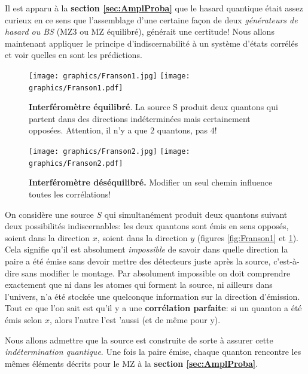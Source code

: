 Il est apparu à la \textbf{section \ref{sec:AmplProba}} que le hasard quantique
était assez curieux en ce sens que l'assemblage d'une certaine façon de deux
\emph{générateurs de hasard ou BS} (MZ3 ou MZ équilibré), générait une
certitude! Nous allons maintenant appliquer le principe d'indiscernabilité à un
système d'états corrélés et voir quelles en sont les prédictions.

\begin{figure}[ptbh]
\centering
\begin{minipage}[c]{.48\linewidth}
\centering
\ifcase\msipdfoutput
	\texttt{[image: graphics/Franson1.jpg]}%
\else
	\texttt{[image: graphics/Franson1.pdf]}%
\fi
\caption{\textbf{Interféromètre équilibré}. La source S produit deux quantons
qui partent dans des directions indéterminées mais certainement opposées.
Attention, il n'y a que $2$ quantons, pas $4$!}%
\label{fig:Franson1}%
\end{minipage} \hfill\begin{minipage}[c]{.48\linewidth}
\centering
\ifcase\msipdfoutput
  \texttt{[image: graphics/Franson2.jpg]}%
\else
  \texttt{[image: graphics/Franson2.pdf]}%
\fi
\caption{\textbf{Interféromètre déséquilibré.} Modifier un seul chemin influence
toutes les corrélations!}%
\label{fig:Franson2}%
\end{minipage}
\end{figure}

On considère une source $S$ qui simultanément produit deux quantons suivant deux
possibilités indiscernables: les deux quantons sont émis en sens opposés, soient
dans la direction $x$, soient dans la direction $y$ (figures \ref{fig:Franson1}
et \ref{fig:Franson2}). Cela signifie qu'il est absolument \emph{impossible} de
savoir dans quelle direction la paire a été émise sans devoir mettre des
détecteurs juste après la source, c'est-à-dire sans modifier le montage. Par
absolument impossible on doit comprendre exactement que ni dans les atomes qui
forment la source, ni ailleurs dans l'univers, n'a été stockée une quelconque
information sur la direction d'émission. Tout ce que l'on sait est qu'il y a une
\textbf{corrélation parfaite}: si un quanton a été émis selon $x$, alors l'autre
l'est 'aussi (et de même pour y).

Nous allons admettre que la source est construite de sorte à assurer cette
\emph{indétermination quantique}. Une fois la paire émise, chaque quanton
rencontre les mêmes éléments décrits pour le MZ à la \textbf{section
\ref{sec:AmplProba}}.

